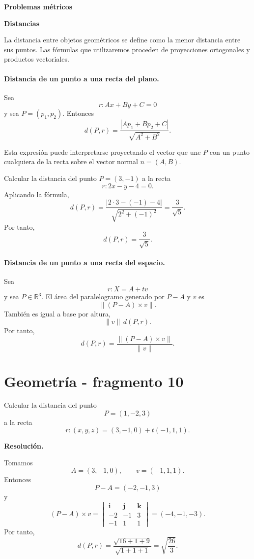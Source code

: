 \textbf{Problemas métricos}

\textbf{Distancias}

La distancia entre objetos geométricos se define como la menor distancia entre sus puntos. Las fórmulas que utilizaremos proceden de proyecciones ortogonales y productos vectoriales.

\paragraph{Distancia de un punto a una recta del plano.}
Sea
\[
r:Ax+By+C=0
\]
y sea $P=(p_1,p_2)$. Entonces
\[
\boxed{
 d(P,r)=
 \frac{|Ap_1+Bp_2+C|}{\sqrt{A^2+B^2}}.}
\]

Esta expresión puede interpretarse proyectando el vector que une $P$ con un punto cualquiera de la recta sobre el vector normal $n=(A,B)$.

\begin{example}
Calcular la distancia del punto $P=(3,-1)$ a la recta
\[
r:2x-y-4=0.
\]
Aplicando la fórmula,
\[
d(P,r)
=\frac{|2\cdot3-(-1)-4|}{\sqrt{2^2+(-1)^2}}
=\frac{3}{\sqrt5}.
\]
Por tanto,
\[
\boxed{d(P,r)=\frac{3}{\sqrt5}.}
\]
\end{example}

\paragraph{Distancia de un punto a una recta del espacio.}
Sea
\[
r:X=A+tv
\]
y sea $P\in\mathbb{R}^3$. El área del paralelogramo generado por $P-A$ y $v$ es
\[
\|(P-A)\times v\|.
\]
También es igual a base por altura,
\[
\|v\|\,d(P,r).
\]
Por tanto,
\[
\boxed{
 d(P,r)=\frac{\|(P-A)\times v\|}{\|v\|}.}
\]


\section{Geometría - fragmento 10}
\begin{solvedexercise}
Calcular la distancia del punto
\[
P=(1,-2,3)
\]
a la recta
\[
r:(x,y,z)=(3,-1,0)+t(-1,1,1).
\]

\textbf{Resolución.}\par\smallskip
Tomamos
\[
A=(3,-1,0),
\qquad
v=(-1,1,1).
\]
Entonces
\[
P-A=(-2,-1,3)
\]
y
\[
(P-A)\times v
=
\begin{vmatrix}
\mathbf i&\mathbf j&\mathbf k\\
-2&-1&3\\
-1&1&1
\end{vmatrix}
=(-4,-1,-3).
\]
Por tanto,
\[
d(P,r)
=\frac{\sqrt{16+1+9}}{\sqrt{1+1+1}}
=\boxed{\sqrt{\frac{26}{3}}}.
\]
\end{solvedexercise}

